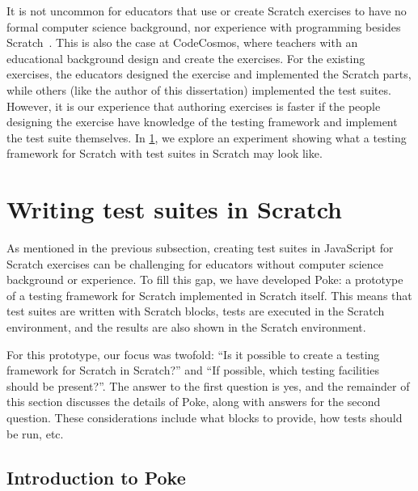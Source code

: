 \documentclass[../main]{subfiles}
\begin{document}
It is not uncommon for educators that use or create Scratch exercises to have no formal computer science background, nor experience with programming besides Scratch~\autocite{kimEnhancingTeachersICT2012,oliveiraIntroductionComputationalThinking2019}.
This is also the case at CodeCosmos, where teachers with an educational background design and create the exercises.
For the existing exercises, the educators designed the exercise and implemented the Scratch parts, while others (like the author of this dissertation) implemented the test suites.
However, it is our experience that authoring exercises is faster if the people designing the exercise have knowledge of the testing framework and implement the test suite themselves.
In \cref{sec:poke:-a-testing-framework-written-in-scratch}, we explore an experiment showing what a testing framework for Scratch with test suites in Scratch may look like.

\section{Writing test suites in Scratch}\label{sec:poke:-a-testing-framework-written-in-scratch}

As mentioned in the previous subsection, creating test suites in JavaScript for Scratch exercises can be challenging for educators without computer science background or experience.
To fill this gap, we have developed Poke: a prototype of a testing framework for Scratch implemented in Scratch itself.
This means that test suites are written with Scratch blocks, tests are executed in the Scratch environment, and the results are also shown in the Scratch environment.

For this prototype, our focus was twofold: ``Is it possible to create a testing framework for Scratch in Scratch?'' and ``If possible, which testing facilities should be present?''.
The answer to the first question is yes, and the remainder of this section discusses the details of Poke, along with answers for the second question.
These considerations include what blocks to provide, how tests should be run, etc.

\subsection{Introduction to Poke}\label{subsec:introduction-to-poke}
\end{document}
